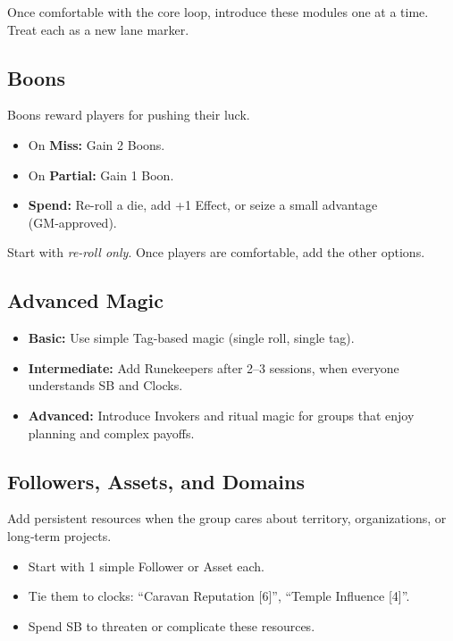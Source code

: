 Once comfortable with the core loop, introduce these modules one at a time. Treat each as a new lane marker.

\subsection{Boons}
\label{subsec:boons-gm}
Boons reward players for pushing their luck.
\begin{itemize}
\item On \textbf{Miss:} Gain 2 Boons.
\item On \textbf{Partial:} Gain 1 Boon.
\item \textbf{Spend:} Re-roll a die, add +1 Effect, or seize a small advantage (GM‑approved).
\end{itemize}
Start with \emph{re-roll only}. Once players are comfortable, add the other options.

\subsection{Advanced Magic}
\label{subsec:advanced-magic}
\begin{itemize}
\item \textbf{Basic:} Use simple Tag-based magic (single roll, single tag).
\item \textbf{Intermediate:} Add Runekeepers after 2–3 sessions, when everyone understands SB and Clocks.
\item \textbf{Advanced:} Introduce Invokers and ritual magic for groups that enjoy planning and complex payoffs.
\end{itemize}

\subsection{Followers, Assets, and Domains}
\label{subsec:followers-assets}
Add persistent resources when the group cares about territory, organizations, or long‑term projects.
\begin{itemize}
\item Start with 1 simple Follower or Asset each.
\item Tie them to clocks: “Caravan Reputation [6]”, “Temple Influence [4]”.
\item Spend SB to threaten or complicate these resources.
\end{itemize}

